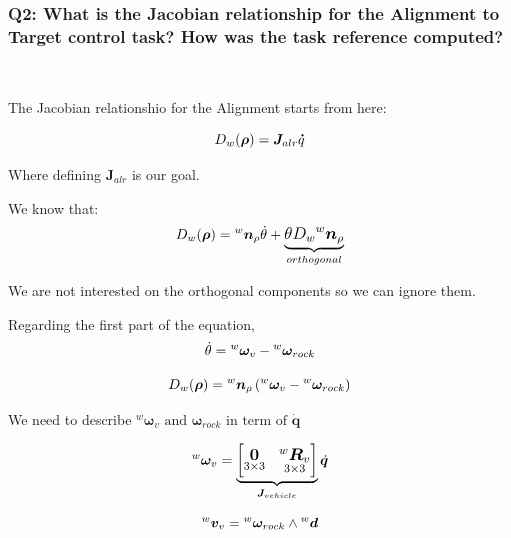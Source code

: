 \documentclass{article}
\begin{document}
\subsubsection{Q2: What is the Jacobian relationship for the Alignment to Target control task? How was the task reference computed?} \

The Jacobian relationshio for the Alignment starts from here:

\begin{equation}
\large
D_{w}(\boldsymbol \rho)=\boldsymbol J_{alr} \boldsymbol \dot{q}
\end{equation}

Where defining $\boldsymbol J_{alr} $ is our goal.

We know that:
\begin{equation}
\large
D_{w}(\boldsymbol \rho)={^w}\boldsymbol n_{\rho} \dot\theta+\underbrace{\theta D_{w} {^w}{\boldsymbol n_{\rho}}}_{orthogonal}
\end{equation}

We are not interested on the orthogonal components so we can ignore them.

Regarding the first part of the equation,
\begin{equation}
\large
\dot{\theta}={^w}\boldsymbol{\omega}_{v} - {^w}{\boldsymbol\omega_{{rock}}}
\end{equation}

\begin{equation}
\large
D_w(\boldsymbol \rho)={^w}\boldsymbol n_\rho\left({^w}{\boldsymbol \omega}_{v}-{^w}{\boldsymbol \omega_{rock}}\right)
\end{equation}

We need to describe ${^w}{\boldsymbol{\omega}}_{v} \text{ and } \boldsymbol{\omega}_{rock} \text{ in term of } \boldsymbol{\dot{q}} $

\begin{equation}
\large
{^w}\boldsymbol \omega_{v} = 
\underbrace{
    \begin{bmatrix}
     \underset{3\times 3}{\boldsymbol{0}} & \underset{ 3\times 3}{^{w}\boldsymbol{R}_{v}}\\
    \end{bmatrix}
}_{\boldsymbol J_{vehicle}}
\dot{\boldsymbol{q}}
\end{equation}

\begin{equation}
\large
{^w}{\boldsymbol v}_{v}={^w}\boldsymbol \omega_{rock} \wedge {^w} \boldsymbol d
\end{equation}
\end{document}
